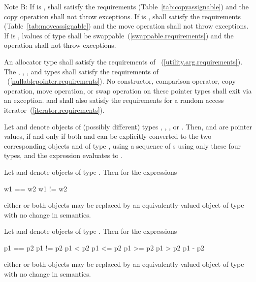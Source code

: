 \pnum
Note B:
If  is ,
 shall satisfy the
 requirements (Table~\ref{tab:copyassignable})
and the copy operation shall not throw exceptions.
If  is ,
 shall satisfy the
 requirements (Table~\ref{tab:moveassignable})
and the move operation shall not throw exceptions.
If  is ,
lvalues of type  shall be swappable~(\ref{swappable.requirements})
and the  operation shall not throw exceptions.

\pnum
An allocator type  shall satisfy the requirements of
~(\ref{utility.arg.requirements}).
The , , , and
 types shall satisfy the requirements of
~(\ref{nullablepointer.requirements}).
No constructor,
comparison operator, copy operation, move operation, or swap operation on
these pointer types shall exit via an exception.  and  shall also
satisfy the requirements for a random access
iterator~(\ref{iterator.requirements}).

\pnum
Let  and  denote objects of (possibly different) types
, , ,
or . Then,  and  are
 pointer values, if and only if both  and 
can be explicitly converted to the two corresponding objects  and 
of type , using a sequence of s
using only these four types, and the expression 
evaluates to .

\pnum
Let  and  denote objects of type .
Then for the expressions
\begin{codeblock}
w1 == w2
w1 != w2
\end{codeblock}
either or both objects may be replaced by an equivalently-valued object of type
 with no change in semantics.

\pnum
Let  and  denote objects of type .
Then for the expressions
\begin{codeblock}
p1 == p2
p1 != p2
p1 < p2
p1 <= p2
p1 >= p2
p1 > p2
p1 - p2
\end{codeblock}
either or both objects may be replaced by an equivalently-valued object of type
 with no change in semantics.

